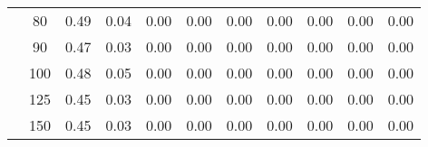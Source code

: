 \begin{table}[t]
\begin{center}
\begin{subtable}[c]{\textwidth}
\begin{center}
\begin{tabular}{rcccccccccc}
                                            & \multicolumn{1}{c|}{80}  & \num{0.49}  & \num{0.04}  & \num{0.00}  & \num{0.00}  & \num{0.00}  & \num{0.00}  & \num{0.00}  & \num{0.00}  & \num{0.00}  \\
                                            & \multicolumn{1}{c|}{90}  & \num{0.47}  & \num{0.03}  & \num{0.00}  & \num{0.00}  & \num{0.00}  & \num{0.00}  & \num{0.00}  & \num{0.00}  & \num{0.00}  \\
                                            & \multicolumn{1}{c|}{100}  & \num{0.48}  & \num{0.05}  & \num{0.00}  & \num{0.00}  & \num{0.00}  & \num{0.00}  & \num{0.00}  & \num{0.00}  & \num{0.00}  \\
                                            & \multicolumn{1}{c|}{125}  & \num{0.45}  & \num{0.03}  & \num{0.00}  & \num{0.00}  & \num{0.00}  & \num{0.00}  & \num{0.00}  & \num{0.00}  & \num{0.00}  \\
                                            & \multicolumn{1}{c|}{150}  & \num{0.45}  & \num{0.03}  & \num{0.00}  & \num{0.00}  & \num{0.00}  & \num{0.00}  & \num{0.00}  & \num{0.00}  & \num{0.00}  \\
                                    \end{tabular}
            \end{center}
        \end{subtable}

        \vspace{5mm}


\end{center}
\end{table}
